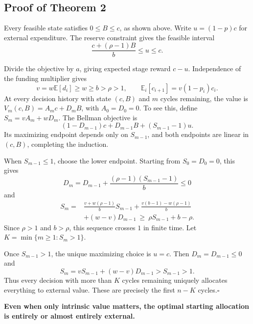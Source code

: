 \documentclass[11pt]{article}
\begin{document}
\subsection*{Proof of Theorem 2}

Every feasible state satisfies $0\le B\le c$, as shown above.
Write $u=(1-p)c$ for external expenditure. The reserve constraint gives the feasible interval
\[
 \frac{c+(\rho-1)B}{b}\le u\le c.
\]

Divide the objective by $a$, giving expected stage reward $c-u$. Independence of the funding multiplier gives
\[
 v=w\mathbb E[d_i]\ge w\ge b>\rho>1,\qquad \mathbb E_i[c_{i+1}]=v(1-p_i)c_i.
\]
At every decision history with state $(c,B)$ and $m$ cycles remaining, the value is $V_m(c,B)=A_m c+D_m B$, with $A_0=D_0=0$. To see this, define $S_m=vA_m+wD_m$. The Bellman objective is
\[
 (1-D_{m-1})c+D_{m-1}B+(S_{m-1}-1)u.
\]
Its maximizing endpoint depends only on $S_{m-1}$, and both endpoints are linear in $(c,B)$, completing the induction.

When $S_{m-1}\le1$, choose the lower endpoint. Starting from $S_0=D_0=0$, this gives
\[
 D_m=D_{m-1}+\frac{(\rho-1)(S_{m-1}-1)}{b}\le0
\]
and
\[
 \begin{aligned}
 S_m={}&\frac{v+w(\rho-1)}{b}S_{m-1}
 +\frac{v(b-1)-w(\rho-1)}{b}\\
 &+(w-v)D_{m-1}
 \ \ge\ \rho S_{m-1}+b-\rho.
 \end{aligned}
\]
Since $\rho>1$ and $b>\rho$, this sequence crosses $1$ in finite time. Let $K=\min\{m\ge1:S_m>1\}$.

Once $S_{m-1}>1$, the unique maximizing choice is $u=c$. Then $D_m=D_{m-1}\le0$ and
\[
 S_m=vS_{m-1}+(w-v)D_{m-1}>S_{m-1}>1.
\]
Thus every decision with more than $K$ cycles remaining uniquely allocates everything to external value. These are precisely the first $n-K$ cycles.\hfill$\square$

\medskip
\textbf{Even when only intrinsic value matters, the optimal starting allocation is entirely or almost entirely external.}
\end{document}
